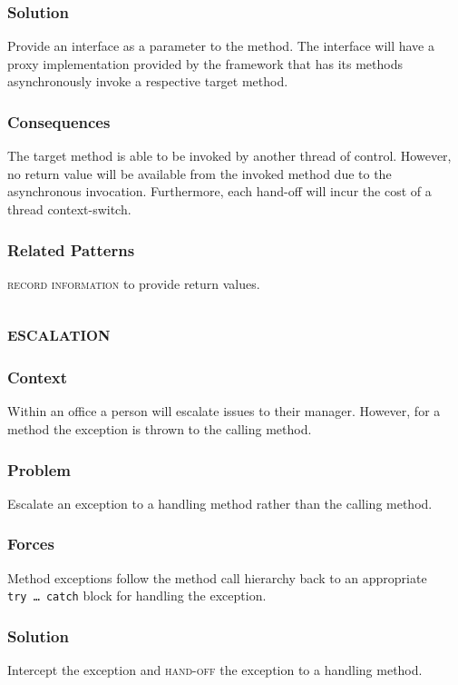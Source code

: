 \documentclass[prodmode]{style/acmlarge}
\begin{document}
\subsubsection*{Solution}  Provide an interface as a parameter to the method.
The interface will have a proxy implementation provided by the framework that
has its methods asynchronously invoke a respective target method.

\subsubsection*{Consequences} The target method is able to be invoked by another
thread of control.  However, no return value will be available from the invoked
method due to the asynchronous invocation.  Furthermore, each hand-off will
incur the cost of a thread context-switch.

\subsubsection*{Related Patterns} \textsc{record information} to provide return
values.



\subsection{\textsc{\textbf{escalation}}}

\subsubsection*{Context} Within an office a person will escalate issues to their
manager.  However, for a method the exception is thrown to the calling method.

\subsubsection*{Problem} Escalate an exception to a handling method rather than
the calling method.

\subsubsection*{Forces} Method exceptions follow the method call hierarchy back
to an appropriate \texttt{try~\ldots~catch} block for handling the exception.

\subsubsection*{Solution} Intercept the exception and \textsc{hand-off} the
exception to a handling method.
\end{document}
